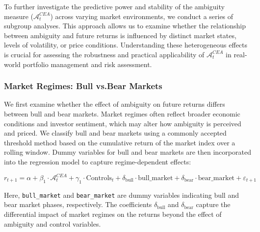 \documentclass[preprint,12pt,authoryear]{elsarticle}
\begin{document}
To further investigate the predictive power and stability of the ambiguity measure ($\mathcal{A}^{CEA}_t$) across varying market environments, we conduct a series of subgroup analyses. This approach allows us to examine whether the relationship between ambiguity and future returns is influenced by distinct market states, levels of volatility, or price conditions. Understanding these heterogeneous effects is crucial for assessing the robustness and practical applicability of $\mathcal{A}^{CEA}_t$ in real-world portfolio management and risk assessment.

\subsubsection{Market Regimes: Bull vs.Bear Markets} \label{subsec:market_regimes}

We first examine whether the effect of ambiguity on future returns differs between bull and bear markets. Market regimes often reflect broader economic conditions and investor sentiment, which may alter how ambiguity is perceived and priced. We classify bull and bear markets using a commonly accepted threshold method based on the cumulative return of the market index over a rolling window. Dummy variables for bull and bear markets are then incorporated into the regression model to capture regime-dependent effects:

\begin{equation}
r_{t+1} = \alpha + \beta_1 \cdot \mathcal{A}^{CEA}_t + \gamma_1 \cdot \mathrm{Controls}_t + \delta_{\text{bull}} \cdot \text{bull\_market} + \delta_{\text{bear}} \cdot \text{bear\_market} + \varepsilon_{t+1}
\end{equation}

Here, \texttt{bull\_market} and \texttt{bear\_market} are dummy variables indicating bull and bear market phases, respectively. The coefficients $\delta_{\text{bull}}$ and $\delta_{\text{bear}}$ capture the differential impact of market regimes on the returns beyond the effect of ambiguity and control variables.
\end{document}
